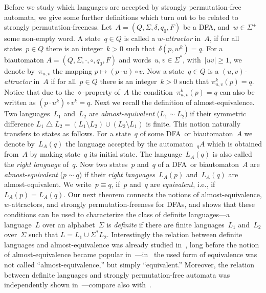 \documentclass[submission]{eptcs}
\newcommand{\dfa}{\textrm{DFA}}
\newcommand{\abs}[1]{\left\lvert{#1}\right\rvert}
\newcommand{\symd}{\mathop{\bigtriangleup}}
\begin{document}
Before we study which languages are accepted by strongly
permutation-free automata, we give some further definitions which turn
out to be related to strongly permutation-freeness.
Let~$A=(Q,\Sigma,\delta,q_0,F)$ be a \dfa, and~$w\in \Sigma^+$ some
non-empty word.  A state~$q\in Q$ is called a \emph{$w$-attractor}
in~$A$, if for all states~$p\in Q$ there is an integer~$k>0$ such
that~$\delta(p,w^k)=q$.
For a biautomaton $A=(Q,\Sigma,\cdot,\circ,q_0,F)$ and
words~$u,v\in\Sigma^*$, with~$\abs{uv}\geq 1$, we denote
by~$\pi_{u,v}$ the mapping $p\mapsto (p\cdot u)\circ v$.  Now a
state~$q\in Q$ is a \emph{$(u,v)$-attractor} in~$A$ if for all~$p\in
Q$ there is an integer~$k>0$ such that $\pi_{u,v}^k(p) = q$.  Notice
that due to the $\diamond$-property of~$A$ the
condition~$\pi_{u,v}^k(p) = q$ can also be written as $(p\cdot
u^k)\circ v^k = q$.
Next we recall the definition of almost-equivalence.  Two
languages~$L_1$ and~$L_2$ are \emph{almost-equivalent} ($L_1\sim L_2$)
if their symmetric difference $L_1\symd L_2 = (L_1\setminus L_2) \cup
(L_2\setminus L_1)$ is finite.  This notion naturally transfers to
states as follows.  For a state~$q$ of some \dfa\ or biautomaton~$A$
we denote by~$L_A(q)$ the language accepted by the automaton~${}_qA$
which is obtained from~$A$ by making state~$q$ its initial state.  The
language~$L_A(q)$ is also called the \emph{right language} of~$q$. Now
two states~$p$ and~$q$ of a \dfa\ or biautomaton~$A$ are
\emph{almost-equivalent} ($p\sim q$) if their \emph{right
  languages}~$L_A(p)$ and~$L_A(q)$ are almost-equivalent.  We
write~$p\equiv q$, if~$p$ and~$q$ are \emph{equivalent}, i.e.,
if~$L_A(p)=L_A(q)$.
Our next theorem connects the notions of almost-equivalence,
$w$-attractors, and strongly permutation-freeness for \dfa s, and
shows that these conditions can be used to characterize the class of
definite languages---a language~$L$ over an alphabet~$\Sigma$ is
\emph{definite} if there are finite languages~$L_1$ and~$L_2$
over~$\Sigma$ such that $L = L_1\cup \Sigma^*L_2$.
Interestingly the relation between definite languages and
almost-equivalence was already studied in~\cite{PRS63}, long before
the notion of almost-equivalence became popular
in~\cite{BGS09}---in~\cite{PRS63} the used form of equivalence was
not called ``almost-equivalence,'' but simply ``equivalent.''
Moreover, the relation between definite languages and strongly
permutation-free automata was independently shown
in~\cite{BrLi12}---compare also with~\cite[Exercise~28 of Chapter~4
and Exercise~13 of Chapter~5]{McNaPa71}. 
\end{document}
